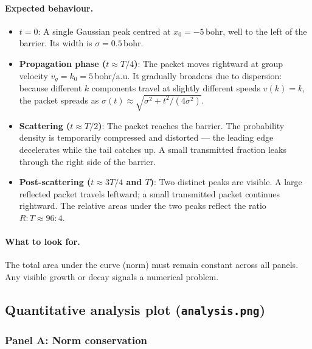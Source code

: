 \documentclass[12pt, a4paper]{article}
\begin{document}
\paragraph{Expected behaviour.}
\begin{itemize}
  \item \textbf{$t = 0$}: A single Gaussian peak centred at $x_0 = -5$\,bohr,
        well to the left of the barrier.  Its width is $\sigma = 0.5$\,bohr.

  \item \textbf{Propagation phase ($t \approx T/4$)}: The packet moves
        rightward at group velocity $v_g = k_0 = 5$\,bohr/a.u.  It
        gradually broadens due to dispersion: because different $k$
        components travel at slightly different speeds $v(k) = k$, the
        packet spreads as $\sigma(t) \approx \sqrt{\sigma^2 + t^2/(4\sigma^2)}$.

  \item \textbf{Scattering ($t \approx T/2$)}: The packet reaches the
        barrier.  The probability density is temporarily compressed and
        distorted — the leading edge decelerates while the tail catches up.
        A small transmitted fraction leaks through the right side of the
        barrier.

  \item \textbf{Post-scattering ($t \approx 3T/4$ and $T$)}: Two distinct
        peaks are visible.  A large reflected packet travels leftward; a
        small transmitted packet continues rightward.  The relative areas
        under the two peaks reflect the ratio $R:T \approx 96:4$.
\end{itemize}

\paragraph{What to look for.}
The total area under the curve (norm) must remain constant across all
panels.  Any visible growth or decay signals a numerical problem.

\subsection{Quantitative analysis plot (\texttt{analysis.png})}

\subsubsection{Panel A: Norm conservation}
\end{document}
